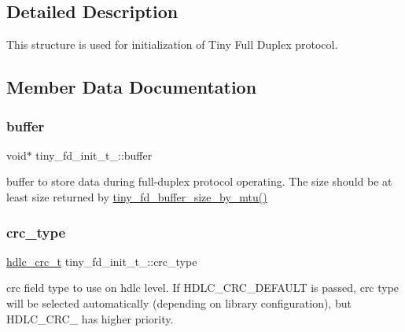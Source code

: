 \subsection{Detailed Description}
This structure is used for initialization of Tiny Full Duplex protocol. 

\subsection{Member Data Documentation}
\mbox{\label{structtiny__fd__init__t___a9a82b8c6c060dbc17022a0c902d436f2}} 
\subsubsection{\texorpdfstring{buffer}{buffer}}
{\footnotesize\ttfamily void$\ast$ tiny\+\_\+fd\+\_\+init\+\_\+t\+\_\+\+::buffer}

buffer to store data during full-\/duplex protocol operating. The size should be at least size returned by \hyperlink{group__FULL__DUPLEX__API_ga19789bea5b5acd68804773f0d6b0e3f7}{tiny\+\_\+fd\+\_\+buffer\+\_\+size\+\_\+by\+\_\+mtu()} \mbox{\label{structtiny__fd__init__t___ac69d819ccec020c8382eee492070a85a}} 
\subsubsection{\texorpdfstring{crc\+\_\+type}{crc\_type}}
{\footnotesize\ttfamily \hyperlink{group__HDLC__API_gabb73b32d08d8e79eefe9385634a74bf7}{hdlc\+\_\+crc\+\_\+t} tiny\+\_\+fd\+\_\+init\+\_\+t\+\_\+\+::crc\+\_\+type}

crc field type to use on hdlc level. If H\+D\+L\+C\+\_\+\+C\+R\+C\+\_\+\+D\+E\+F\+A\+U\+LT is passed, crc type will be selected automatically (depending on library configuration), but H\+D\+L\+C\+\_\+\+C\+R\+C\+\_ has higher priority. \mbox{\label{structtiny__fd__init__t___ae366ae6e7626b0d92a6e5088c29169cd}} 
